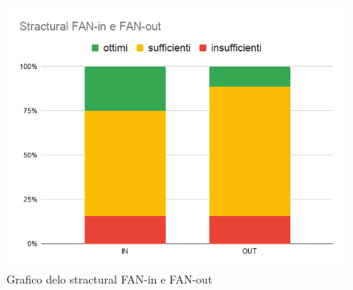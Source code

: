         \begin{figure}[H]
            \centering
            \includegraphics[width=13 cm]{source/sections/images/SfinSfout.png}
            \caption{Grafico delo stractural FAN-in e FAN-out}
        \end{figure}